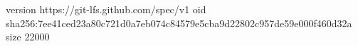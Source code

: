 version https://git-lfs.github.com/spec/v1
oid sha256:7ee41ced23a80c721d0a7eb074c84579e5cba9d22802c957de59e000f460d32a
size 22000
